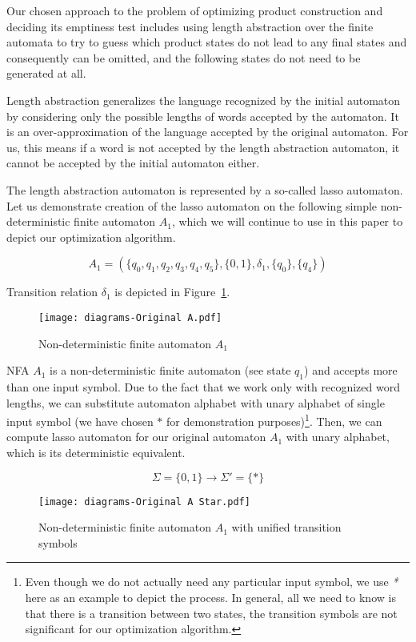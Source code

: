 Our chosen approach to the problem of optimizing product construction and deciding its emptiness test includes using length abstraction over the finite automata to try to guess which product states do not lead to any final states and consequently can be omitted, and the following states do not need to be generated at all.

Length abstraction generalizes the language recognized by the initial automaton by considering only the possible lengths of words accepted by the automaton. It is an over-approximation of the language accepted by the original automaton. For us, this means if a word is not accepted by the length abstraction automaton, it cannot be accepted by the initial automaton either.

The length abstraction automaton is represented by a so-called lasso automaton. Let us demonstrate creation of the lasso automaton on the following simple non-deterministic finite automaton $A_1$, which we will continue to use in this paper to depict our optimization algorithm.

$$ A_1 = (\{q_0, q_1, q_2, q_3, q_4, q_5\}, \{0, 1\}, \delta_1, \{q_0\}, \{q_4\}) $$

Transition relation $\delta_1$ is depicted in Figure~\ref{fig:NFA_A1_orig}.

\begin{figure}[ht]
	\centering
	\texttt{[image: diagrams-Original A.pdf]}
	\caption{Non-deterministic finite automaton $A_1$}
	\label{fig:NFA_A1_orig}
\end{figure}

NFA $A_1$ is a non-deterministic finite automaton (see state $q_1$) and accepts more than one input symbol. Due to the fact that we work only with recognized word lengths, we can substitute automaton alphabet with unary alphabet of single input symbol (we have chosen $*$ for demonstration purposes)\footnote{Even though we do not actually need any particular input symbol, we use \emph{*} here as an example to depict the process. In general, all we need to know is that there is a transition between two states, the transition symbols are not significant for our optimization algorithm.}. Then, we can compute lasso automaton for our original automaton $A_1$ with unary alphabet, which is its deterministic equivalent.

$$\Sigma = \{0, 1\} \longrightarrow \Sigma' = \{*\} $$

\begin{figure}[ht]
	\centering
	\texttt{[image: diagrams-Original A Star.pdf]}
	\caption{Non-deterministic finite automaton $A_1$ with unified transition symbols}
	\label{fig:NFA_A1_star}
\end{figure}

